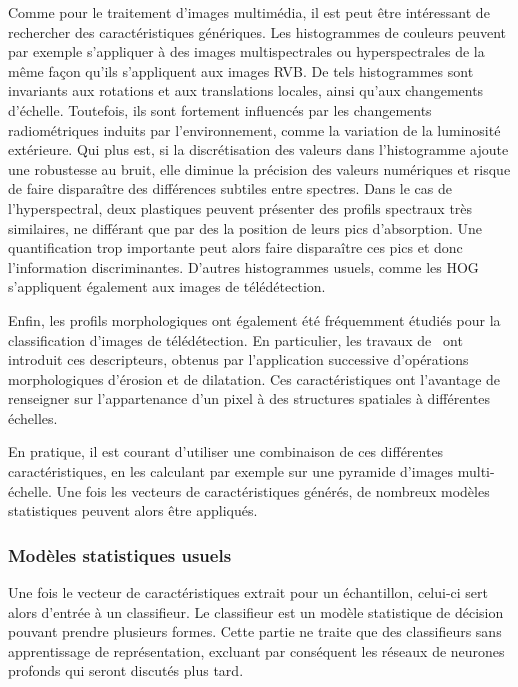 Comme pour le traitement d'images multimédia, il est peut être intéressant de rechercher des caractéristiques génériques. Les histogrammes de couleurs peuvent par exemple s'appliquer à des images multispectrales ou hyperspectrales de la même façon qu'ils s'appliquent aux images \gls{RVB}. De tels histogrammes sont invariants aux rotations et aux translations locales, ainsi qu'aux changements d'échelle. Toutefois, ils sont fortement influencés par les changements radiométriques induits par l'environnement, comme la variation de la luminosité extérieure. Qui plus est, si la discrétisation des valeurs dans l'histogramme ajoute une robustesse au bruit, elle diminue la précision des valeurs numériques et risque de faire disparaître des différences subtiles entre spectres. Dans le cas de l'hyperspectral, deux plastiques peuvent présenter des profils spectraux très similaires, ne différant que par des la position de leurs pics d'absorption. Une quantification trop importante peut alors faire disparaître ces pics et donc l'information discriminantes. D'autres histogrammes usuels, comme les \gls{HOG}~\cite{dalal_histograms_2005} s'appliquent également aux images de télédétection.

Enfin, les profils morphologiques ont également été fréquemment étudiés pour la classification d'images de télédétection. En particulier, les travaux de~\citet{benediktsson_classification_2003} ont introduit ces descripteurs, obtenus par l'application successive d'opérations morphologiques d'érosion et de dilatation. Ces caractéristiques ont l'avantage de renseigner sur l'appartenance d'un pixel à des structures spatiales à différentes échelles.

En pratique, il est courant d'utiliser une combinaison de ces différentes caractéristiques, en les calculant par exemple sur une pyramide d'images multi-échelle. Une fois les vecteurs de caractéristiques générés, de nombreux modèles statistiques peuvent alors être appliqués.

\subsubsection{Modèles statistiques usuels}

Une fois le vecteur de caractéristiques extrait pour un échantillon, celui-ci sert alors d'entrée à un classifieur. Le classifieur est un modèle statistique de décision pouvant prendre plusieurs formes. Cette partie ne traite que des classifieurs sans apprentissage de représentation, excluant par conséquent les réseaux de neurones profonds qui seront discutés plus tard.

